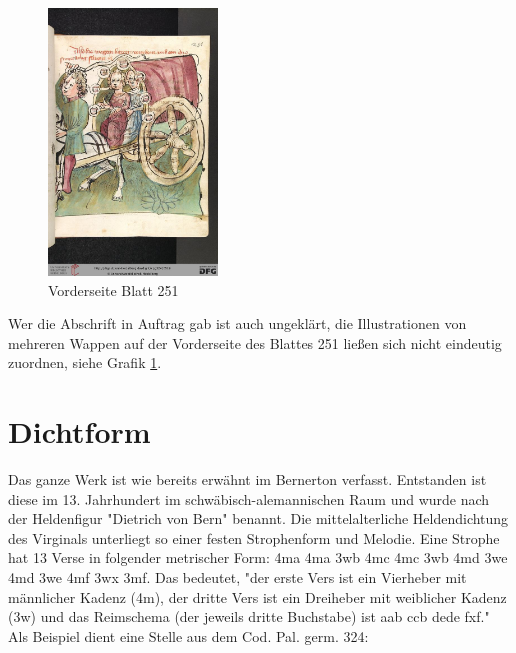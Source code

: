 \documentclass[a4paper, 12pt, oneside]{scrbook}
\begin{document}
\begin{figure}
	\centering
	\includegraphics[width=0.4\textwidth]{0519.jpg}
	\caption{Vorderseite Blatt 251\cite{virginal251r}}
	\label{fig:2}
\end{figure}

Wer die Abschrift in Auftrag gab ist auch ungeklärt, die Illustrationen von mehreren Wappen auf der Vorderseite des Blattes 251 ließen sich nicht eindeutig zuordnen, siehe Grafik \ref*{fig:2}.\cite{ubheidelber_bibpal}
\newpage

\section{Dichtform}
Das ganze Werk ist wie bereits erwähnt im Bernerton verfasst. Entstanden ist diese im 13. Jahrhundert im schwäbisch-alemannischen Raum und wurde nach der Heldenfigur "Dietrich von Bern" benannt. Die mittelalterliche Heldendichtung des Virginals unterliegt so einer festen Strophenform und Melodie. Eine Strophe hat 13 Verse in folgender metrischer Form: 4ma 4ma 3wb 4mc 4mc 3wb 4md 3we 4md 3we 4mf 3wx 3mf. Das bedeutet, "der erste Vers ist ein Vierheber mit männlicher Kadenz (4m), der dritte Vers ist ein Dreiheber mit weiblicher Kadenz (3w) und das Reimschema (der jeweils dritte Buchstabe) ist aab ccb dede fxf."\cite{wiki_bernerton} Als Beispiel dient eine Stelle aus dem Cod. Pal. germ. 324:\\
\end{document}
